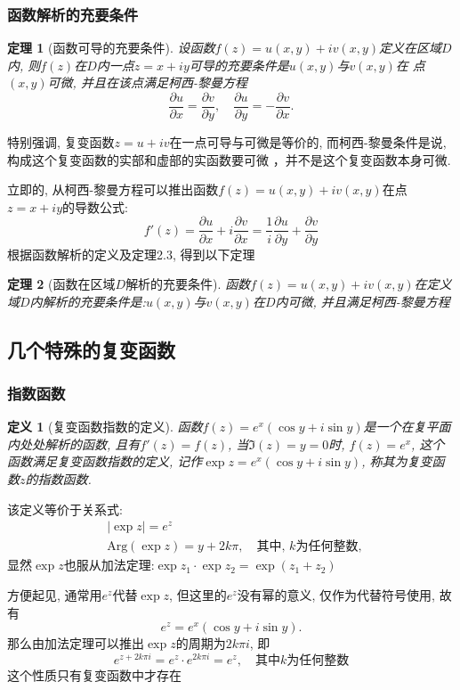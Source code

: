 \documentclass[12pt, a4paper, oneside]{ctexart}
\theoremstyle{plain}
\newtheorem{theorem}{定理}[section]
\newtheorem{definition}{定义}[section]
\theoremstyle{definition}
\theoremstyle{definition}
\begin{document}
\subsubsection{函数解析的充要条件}
\begin{theorem}[函数可导的充要条件]
设函数$f(z)=u(x,y)+iv(x,y)$定义在区域$D$内, 则$f(z)$在$D$内一点$z=x+iy$可导的充要条件是$u(x,y)$与$v(x,y)$在
点$(x,y)$可微, 并且在该点满足柯西-黎曼方程
\[
    \frac{\partial u}{\partial x}=\frac{\partial v}{\partial y}, \quad\frac{\partial u}{\partial y}=
    -\frac{\partial v}{\partial x}.
\]
\end{theorem}
特别强调, 复变函数$z=u+iv$在一点可导与可微是等价的, 而柯西-黎曼条件是说, 构成这个复变函数的实部和虚部的实函数要可微
，并不是这个复变函数本身可微.

立即的, 从柯西-黎曼方程可以推出函数$f(z)=u(x,y)+iv(x,y)$在点$z=x+iy$的导数公式:
\[
    f'(z)=\frac{\partial u}{\partial x}+i\frac{\partial v}{\partial x}=
    \frac{1}{i}\frac{\partial u}{\partial y}+\frac{\partial v}{\partial y}
\]
根据函数解析的定义及定理2.3, 得到以下定理
\begin{theorem}[函数在区域$D$解析的充要条件]
    函数$f(z)=u(x,y)+iv(x,y)$在定义域$D$内解析的充要条件是:$u(x,y)$与$v(x,y)$在$D$内可微, 并且满足柯西-黎曼方程
\end{theorem}
\subsection{几个特殊的复变函数}
\subsubsection{指数函数}
\begin{definition}[复变函数指数的定义]
    函数$f(z)=e^x(\cos y+i\sin y)$是一个在复平面内处处解析的函数, 且有$f'(z)=f(z)$, 当$\Im(z)=y=0$时, $f(z)=e^x$, 
    这个函数满足复变函数指数的定义, 记作$\exp z=e^x(\cos y+i\sin y)$, 称其为复变函数$z$的指数函数.
\end{definition}
\noindent 该定义等价于关系式:
\begin{align*}
    &\left\lvert \exp z\right\rvert =e^z\\
    &\text{Arg}(\exp z)=y+2k\pi, \quad\text{其中, $k$为任何整数, }
\end{align*}
\noindent 显然$\exp z$也服从加法定理:$\exp z_1\cdot\exp z_2=\exp (z_1+z_2)$

方便起见, 通常用$e^z$代替$\exp z$, 但这里的$e^z$没有幂的意义, 仅作为代替符号使用, 故有
\[
e^{z}=e^x(\cos y+i\sin y).
\]
那么由加法定理可以推出$\exp z$的周期为$2k\pi i$, 即
\[
e^{z+2k\pi i} = e^z\cdot e^{2k\pi i}=e^z, \quad \text{其中$k$为任何整数}
\]
这个性质只有复变函数中才存在
\end{document}
